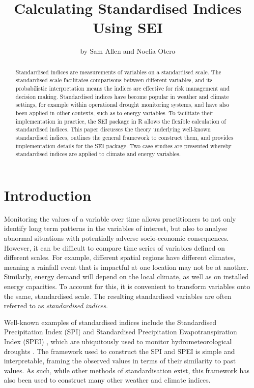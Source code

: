 \title{Calculating Standardised Indices Using SEI}


\author{by Sam Allen and Noelia Otero}

\maketitle

\begin{abstract}%
Standardised indices are measurements of variables on a standardised scale. The standardised scale facilitates comparisons between different variables, and its probabilistic interpretation means the indices are effective for risk management and decision making. Standardised indices have become popular in weather and climate settings, for example within operational drought monitoring systems, and have also been applied in other contexts, such as to energy variables. To facilitate their implementation in practice, the SEI package in R allows the flexible calculation of standardised indices. This paper discusses the theory underlying well-known standardised indices, outlines the general framework to construct them, and provides implementation details for the SEI package. Two case studies are presented whereby standardised indices are applied to climate and energy variables.
\end{abstract}

\hypertarget{introduction}{%
\section{Introduction}\label{introduction}}

Monitoring the values of a variable over time allows practitioners to not only identify long term patterns in the variables of interest, but also to analyse abnormal situations with potentially adverse socio-economic consequences. However, it can be difficult to compare time series of variables defined on different scales. For example, different spatial regions have different climates, meaning a rainfall event that is impactful at one location may not be at another. Similarly, energy demand will depend on the local climate, as well as on installed energy capacities. To account for this, it is convenient to transform variables onto the same, standardised scale. The resulting standardised variables are often referred to as \emph{standardised indices}.

Well-known examples of standardised indices include the Standardised Precipitation Index (SPI) \citep{MckeeEtAl1993} and Standardised Precipitation Evapotranspiration Index (SPEI) \citep{VicenteEtAl2010}, which are ubiquitously used to monitor hydrometeorological droughts \citep{BegueriaEtAl2014}. The framework used to construct the SPI and SPEI is simple and interpretable, framing the observed values in terms of their similarity to past values. As such, while other methods of standardisation exist, this framework has also been used to construct many other weather and climate indices.

